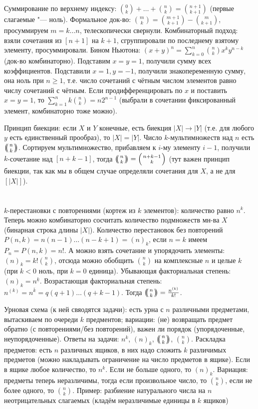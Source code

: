 Суммирование по верхнему индексу: $\binom{0}{k}+\dots+\binom{n}{k}=\binom{n+1}{k+1}$ (первые слагаемые "--- ноль).
Формальное док-во: $\binom{m}{k}=\binom{m+1}{k+1}-\binom{m}{k+1}$, просуммируем $m=k\dots n$, телескопически свернули.
Комбинаторный подход: взяли сочетания из $[n+1]$ на $k+1$, сгруппировали по последнему взятому элементу, просуммировали.
Бином Ньютона: $(x+y)^n=\sum_{k=0}^n \binom{n}{k}x^ky^{n-k}$ (док-во комбинаторно).
Подставим $x=y=1$, получили сумму всех коэффициентов.
Подставили $x=1, y=-1$, получили знакопеременную сумму, она ноль при $n\ge 1$,
т.е. число сочетаний с чётным числом элементов равно числу сочетаний с чётным.
Если продифференцировать по $x$ и поставить $x=y=1$, то $\sum_{k=1}^n k\binom{n}{k} = n2^{n-1}$ (выбрали в сочетании фиксированный элемент, комбинаторно тоже можно).

Принцип биекции: если $X$ и $Y$ конечные, есть биекция $|X|\to|Y|$ (т.е. для любого $y$ есть единственный прообраз), то $|X|=|Y|$.
Число $k$-мультимножеств над $n$ есть $\repbinom{n}{k}$.
Сортируем мультимножество, прибавляем к $i$-му элементу $i-1$, получили $k$-сочетание над $[n+k-1]$,
тогда $\repbinom{n}{k}=\binom{n+k-1}{k}$ (тут важен принцип биекции, так как мы в общем случае определяли сочетания для $X$, а не для $[|X|]$).

\section{} %
$k$-перестановки с повторениями (кортеж из $k$ элементов): количество равно $n^k$.
Теперь можно комбинаторно сосчитать количество подмножеств мн-ва $X$ (бинарная строка длины $|X|$).
Количество перестановок без повторений $P(n, k) = n(n-1)\dots(n-k+1) = (n)_k$, если $n=k$ имеем $P_n=P(n,k)=n!$.
А можно взять сочетание и упорядочить элементы: $(n)_k=k!\binom{n}{k}$, отсюда можно обобщить $\binom{n}{k}$ на
комплексные $n$ и целые $k$ (при $k<0$ ноль, при $k=0$ единица).
Убывающая факториальная степень: $(n)_k=n^{\underline k}$.
Возрастающая факториальная степень: $n^{(k)}=n^{\bar k}=q(q+1)\dots(q+k-1)$.
Тогда $\repbinom{n}{k}=\frac{n^{(k)}}{k!}$.

Урновая схема (к ней свяодятся задачи): есть урна с $n$ различными предметами,
вытаскиваем по очереди $k$ предментов; вариации: (не) возвращать предмет обратно (с повторениями/без повторений),
важен ли порядок (упорядоченные, неупорядоченные).
Ответы на задачи: $n^k$, $(n)_k$, $\repbinom{n}{k}$, $\binom{n}{k}$.
Раскладка предметов: есть $n$ различных ящиков, в них надо сложить $k$ различимых предметов (можно накладывать ограничение
на число предметов в ящике).
Если в ящике любое количество, то $n^k$.
Если не больше одного, то $(n)_k$.
Вариация: предметы теперь неразличимы, тогда если произвольное число, то $\binom{n}{k}$, если не более одного, то $\binom{n}{k}$.
Пример: разбиение натурального числа на $n$ неотрицательных слагаемых (кладём неразличимые единицы в $k$ ящиков)

